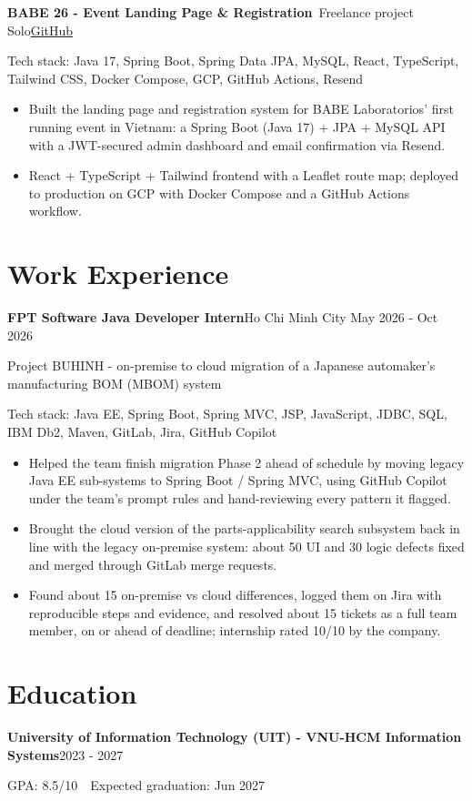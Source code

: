 \documentclass[10pt, a4paper]{article}
\newcommand{\entry}[2]{\textbf{#1}\hfill#2\par}
\newcommand{\subentry}[2]{{\color{MutedText}#1}\hfill{\color{MutedText}#2}\par}
\newcommand{\project}[3]{\textbf{#1}\,{\color{MutedText}\textbar{} #2}\hfill\href{#3}{GitHub}\par}
\newcommand{\techstack}[1]{{\color{MutedText}Tech stack: #1}\par}
\begin{document}
\vspace{2pt}
\project{BABE 26 - Event Landing Page \& Registration}{Freelance project \textbullet{} Solo}{https://github.com/minhphuong150505/landing-page}
\techstack{Java 17, Spring Boot, Spring Data JPA, MySQL, React, TypeScript, Tailwind CSS, Docker Compose, GCP, GitHub Actions, Resend}
\begin{itemize}
  \item Built the landing page and registration system for BABE Laboratorios' first running event in Vietnam: a Spring Boot (Java 17) + JPA + MySQL API with a JWT-secured admin dashboard and email confirmation via Resend.
  \item React + TypeScript + Tailwind frontend with a Leaflet route map; deployed to production on GCP with Docker Compose and a GitHub Actions workflow.
\end{itemize}

\section{Work Experience}
\entry{FPT Software \textbar{} Java Developer Intern}{Ho Chi Minh City \textbar{} May 2026 - Oct 2026}
\subentry{Project BUHINH - on-premise to cloud migration of a Japanese automaker's manufacturing BOM (MBOM) system}{}
\techstack{Java EE, Spring Boot, Spring MVC, JSP, JavaScript, JDBC, SQL, IBM Db2, Maven, GitLab, Jira, GitHub Copilot}
\begin{itemize}
  \item Helped the team finish migration Phase 2 ahead of schedule by moving legacy Java EE sub-systems to Spring Boot / Spring MVC, using GitHub Copilot under the team's prompt rules and hand-reviewing every pattern it flagged.
  \item Brought the cloud version of the parts-applicability search subsystem back in line with the legacy on-premise system: about 50 UI and 30 logic defects fixed and merged through GitLab merge requests.
  \item Found about 15 on-premise vs cloud differences, logged them on Jira with reproducible steps and evidence, and resolved about 15 tickets as a full team member, on or ahead of deadline; internship rated 10/10 by the company.
\end{itemize}

\section{Education}
\entry{University of Information Technology (UIT) - VNU-HCM \textbar{} Information Systems}{2023 - 2027}
GPA: 8.5/10 \,\textbar\, Expected graduation: Jun 2027\par
\end{document}
